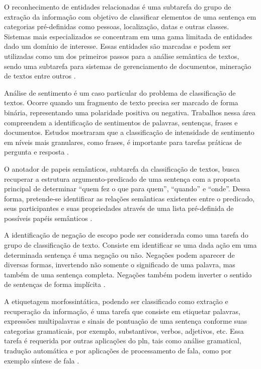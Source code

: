 O reconhecimento de entidades relacionadas é uma subtarefa do grupo de extração da informação com objetivo de classificar elementos de uma sentença em categorias pré-definidas como pessoas, localização, datas e outras classes. Sistemas mais especializados se concentram em uma gama limitada de entidades dado um domínio de interesse. Essas entidades são marcadas e podem ser utilizadas como um dos primeiros passos para a análise semântica de textos, sendo uma subtarefa para sistemas de gerenciamento de documentos, mineração de textos entre outros \cites{Collobert2011Natural}{Carvalho2012ReconhecimentoDE}.

Análise de sentimento é um caso particular do problema de classificação de textos. Ocorre quando um fragmento de texto precisa ser marcado de forma binária, representando uma polaridade positiva ou negativa. Trabalhos nessa área compreendem a identificação de sentimentos de palavras, sentenças, frases e documentos. Estudos mostraram que a classificação de intensidade de sentimento em níveis mais granulares, como frases, é importante para tarefas práticas de pergunta e resposta \cites{Yessenalina2011CompositionalMatrix}{Bakarov2018SurveyWordEmbeddings}.

O anotador de papeis semânticos, subtarefa da classificação de textos, busca recuperar a estrutura argumento-predicado de uma sentença com a proposta principal de determinar \enquote{quem fez o que para quem}, \enquote{quando} e \enquote{onde}. Dessa forma, pretende-se identificar as relações semânticas existentes entre o predicado, seus participantes e suas propriedades através de uma lista pré-definida de possíveis papéis semânticos \cites{He2017DeepSemantic}{Carvalho2012ReconhecimentoDE}.

A identificação de negação de escopo pode ser considerada como uma tarefa do grupo de classificação de texto. Consiste em identificar se uma dada ação em uma determinada sentença é uma negação ou não. Negações podem aparecer de diversas formas, invertendo não somente o significado de uma palavra, mas também de uma sentença completa. Negações também podem inverter o sentido de sentenças de forma implícita \cites{Ettinger2016ProbingForSemantic}{Prollochs2016NegationScopeDetection}.

A etiquetagem morfossintática, podendo ser classificado como extração e recuperação da informação, é uma tarefa que consiste em etiquetar palavras, expressões multipalavras e sinais de pontuação de uma sentença conforme suas categorias gramaticais, por exemplo, substantivos, verbos, adjetivos, etc. Essa tarefa é requerida por outras aplicações do \gls{pln}, tais como análise gramatical, tradução automática e por aplicações de processamento de fala, como por exemplo síntese de fala \cite{Domingues2011Abordagem}.

